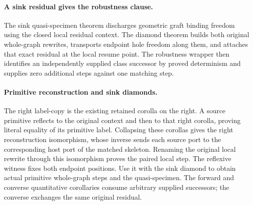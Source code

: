 \paragraph{A sink residual gives the robustness clause.}
The sink quasi-specimen theorem discharges geometric graft binding freedom
using the closed local residual context. The diamond theorem builds both
original whole-graph rewrites, transports endpoint hole freedom along them,
and attaches that exact residual at the local resume point. The robustness
wrapper then identifies an independently supplied class successor by proved
determinism and supplies zero additional steps against one matching step.


\paragraph{Primitive reconstruction and sink diamonds.}
The right label-copy is the existing retained corolla on the right. A source
primitive reflects to the original context and then to that right corolla,
proving literal equality of its primitive label. Collapsing these corollas
gives the right reconstruction isomorphism, whose inverse sends each source
port to the corresponding host port of the matched skeleton. Renaming the
original local rewrite through this isomorphism proves the paired local step.
The reflexive witness fixes both endpoint positions. Use it with the sink
diamond to obtain actual primitive whole-graph steps and the quasi-specimen.
The forward and converse quantitative corollaries consume arbitrary supplied
successors; the converse exchanges the same original residual.

\par{}
\par{}


